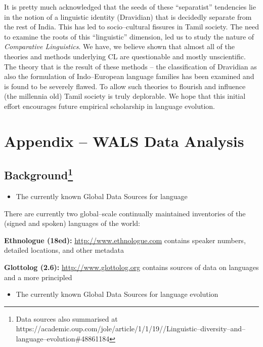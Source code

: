 \newpage

It is pretty much acknowledged that the seeds of these “separatist” tendencies lie in the notion of a linguistic identity (Dravidian) that is decidedly separate from the rest of India. This has led to socio–cultural fissures in Tamil society. The need to examine the roots of this “linguistic” dimension, led us to study the nature of \textit{Comparative Linguistics}. We have, we believe shown that almost all of the theories and methods underlying CL are questionable and mostly unscientific. The theory that is the result of these methods – the classification of Dravidian as also the formulation of Indo–European language families has been examined and is found to be severely flawed. To allow such theories to flourish and influence (the millennia old) Tamil society is truly deplorable. We hope that this initial effort encourages future empirical scholarship in language evolution.


\section*{Appendix – WALS Data Analysis}

\subsection*{Background\protect\footnote{Data sources also summarised at https://academic.oup.com/jole/article/1/1/19//Linguistic–diversity–and–language–evolution\#48861184}}

\begin{itemize}
\item The currently known Global Data Sources for language

\end{itemize}

There are currently two global–scale continually maintained inventories of the (signed and spoken) languages of the world:

\textbf{Ethnologue (18ed):} \url{http://www.ethnologue.com} contains speaker numbers, detailed locations, and other metadata

\textbf{Glottolog (2.6):} \url{http://www.glottolog.org} contains sources of data on languages and a more principled

\begin{itemize}
\item The currently known Global Data Sources for language evolution

\end{itemize}


